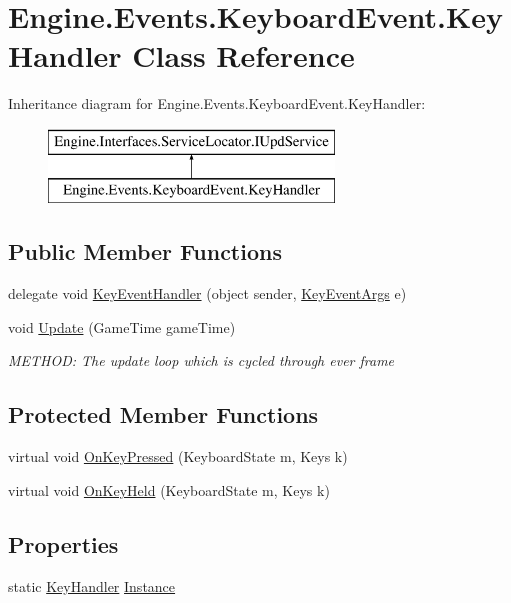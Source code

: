 \hypertarget{a00366}{}\section{Engine.\+Events.\+Keyboard\+Event.\+Key\+Handler Class Reference}
\label{a00366}
Inheritance diagram for Engine.\+Events.\+Keyboard\+Event.\+Key\+Handler\+:\begin{figure}[H]
\begin{center}
\leavevmode
\includegraphics[height=2.000000cm]{d2/d3e/a00366}
\end{center}
\end{figure}
\subsection*{Public Member Functions}
\begin{DoxyCompactItemize}
\item 
delegate void \hyperlink{a00366_a0052951197567196fd40ae4d5e7784e1}{Key\+Event\+Handler} (object sender, \hyperlink{a00362}{Key\+Event\+Args} e)
\item 
void \hyperlink{a00366_a9eb55c55451fa39922f71469f18683ab}{Update} (Game\+Time game\+Time)
\begin{DoxyCompactList}\small\item\em M\+E\+T\+H\+OD\+: The update loop which is cycled through ever frame \end{DoxyCompactList}\end{DoxyCompactItemize}
\subsection*{Protected Member Functions}
\begin{DoxyCompactItemize}
\item 
virtual void \hyperlink{a00366_ae48bbad49979b54cfceebbad82dc48c6}{On\+Key\+Pressed} (Keyboard\+State m, Keys k)
\item 
virtual void \hyperlink{a00366_a8c5bdbe22012f4f6e7febca2c29ec880}{On\+Key\+Held} (Keyboard\+State m, Keys k)
\end{DoxyCompactItemize}
\subsection*{Properties}
\begin{DoxyCompactItemize}
\item 
static \hyperlink{a00366}{Key\+Handler} \hyperlink{a00366_aea9bfd0943bceab24b1632de25df035a}{Instance}
\end{DoxyCompactItemize}

